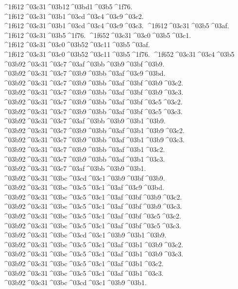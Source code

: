 {^^^^1f612^^^^03c31^^^^03b12^^^^03bd1^^^^03b5^^^^1f76.
^^^^1f612^^^^03c31^^^^03b1^^^^03cd^^^^03c4^^^^03c9^^^^03c2.  		%
^^^^1f612^^^^03c31^^^^03b1^^^^03cd^^^^03c4^^^^03c9^^^^03c3.
^^^^1f612^^^^03c31^^^^03b5^^^^03af.  		%
^^^^1f612^^^^03c31^^^^03b5^^^^1f76.
^^^^1f652^^^^03c31^^^^03c0^^^^03b5^^^^03c1.		%
^^^^1f612^^^^03c31^^^^03c0^^^^03b52^^^^03c11^^^^03b5^^^^03af. 		%
^^^^1f612^^^^03c31^^^^03c0^^^^03b52^^^^03c11^^^^03b5^^^^1f76.
^^^^1f652^^^^03c31^^^^03c4^^^^03b5  		%
^^^^03b92^^^^03c31^^^^03c7^^^^03af^^^^03bb^^^^03b9^^^^03bf^^^^03b9.  		%
^^^^03b92^^^^03c31^^^^03c7^^^^03b9^^^^03bb^^^^03af^^^^03c9^^^^03bd.
^^^^03b92^^^^03c31^^^^03c7^^^^03b9^^^^03bb^^^^03af^^^^03bf^^^^03b9^^^^03c2.
^^^^03b92^^^^03c31^^^^03c7^^^^03b9^^^^03bb^^^^03af^^^^03bf^^^^03b9^^^^03c3.
^^^^03b92^^^^03c31^^^^03c7^^^^03b9^^^^03bb^^^^03af^^^^03bf^^^^03c5^^^^03c2.
^^^^03b92^^^^03c31^^^^03c7^^^^03b9^^^^03bb^^^^03af^^^^03bf^^^^03c5^^^^03c3.
^^^^03b92^^^^03c31^^^^03c7^^^^03af^^^^03bb^^^^03b9^^^^03b1^^^^03b9.
^^^^03b92^^^^03c31^^^^03c7^^^^03b9^^^^03bb^^^^03af^^^^03b1^^^^03b9^^^^03c2.
^^^^03b92^^^^03c31^^^^03c7^^^^03b9^^^^03bb^^^^03af^^^^03b1^^^^03b9^^^^03c3.
^^^^03b92^^^^03c31^^^^03c7^^^^03b9^^^^03bb^^^^03af^^^^03b1^^^^03c2.
^^^^03b92^^^^03c31^^^^03c7^^^^03b9^^^^03bb^^^^03af^^^^03b1^^^^03c3.
^^^^03b92^^^^03c31^^^^03c7^^^^03af^^^^03bb^^^^03b9^^^^03b1.
%
^^^^03b92^^^^03c31^^^^03bc^^^^03cd^^^^03c1^^^^03b9^^^^03bf^^^^03b9. 		%
^^^^03b92^^^^03c31^^^^03bc^^^^03c5^^^^03c1^^^^03af^^^^03c9^^^^03bd.
^^^^03b92^^^^03c31^^^^03bc^^^^03c5^^^^03c1^^^^03af^^^^03bf^^^^03b9^^^^03c2.
^^^^03b92^^^^03c31^^^^03bc^^^^03c5^^^^03c1^^^^03af^^^^03bf^^^^03b9^^^^03c3.
^^^^03b92^^^^03c31^^^^03bc^^^^03c5^^^^03c1^^^^03af^^^^03bf^^^^03c5^^^^03c2.
^^^^03b92^^^^03c31^^^^03bc^^^^03c5^^^^03c1^^^^03af^^^^03bf^^^^03c5^^^^03c3.
^^^^03b92^^^^03c31^^^^03bc^^^^03cd^^^^03c1^^^^03b9^^^^03b1^^^^03b9.
^^^^03b92^^^^03c31^^^^03bc^^^^03c5^^^^03c1^^^^03af^^^^03b1^^^^03b9^^^^03c2.
^^^^03b92^^^^03c31^^^^03bc^^^^03c5^^^^03c1^^^^03af^^^^03b1^^^^03b9^^^^03c3.
^^^^03b92^^^^03c31^^^^03bc^^^^03c5^^^^03c1^^^^03af^^^^03b1^^^^03c2.
^^^^03b92^^^^03c31^^^^03bc^^^^03c5^^^^03c1^^^^03af^^^^03b1^^^^03c3.
^^^^03b92^^^^03c31^^^^03bc^^^^03cd^^^^03c1^^^^03b9^^^^03b1.
}
